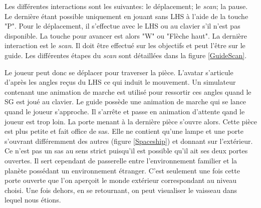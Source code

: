 		\begin{minipage}{\linewidth}
			\label{RoomAndHUD}
		\end{minipage}\medskip	
		
		Les différentes interactions sont les suivantes: le déplacement; le \textit{scan}; la pause. Le dernière étant possible uniquement en jouant sans LHS à l'aide de la touche "P". Pour le déplacement, il s'effectue avec le LHS ou au clavier s'il n'est pas disponible. La touche pour avancer est alors "W" ou "Flèche haut". La dernière interaction est le \textit{scan}. Il doit être effectué sur les objectifs et peut l'être sur le guide. Les différentes étapes du \textit{scan} sont détaillées dans la figure \ref{GuideScan}.
	
		Le joueur peut donc se déplacer pour traverser la pièce. L'avatar s'articule d'après les angles reçus du LHS ce qui induit le mouvement. Un simulateur contenant une animation de marche est utilisé pour ressortir ces angles quand le SG est joué au clavier. Le guide possède une animation de marche qui se lance quand le joueur s'approche. Il s'arrête et passe en animation d'attente qand le joueur est trop loin. La porte menant à la dernière pièce s'ouvre alors. Cette pièce est plus petite et fait office de sas. Elle ne contient qu'une lampe et une porte s'ouvrant différemment des autres (figure \ref{Spaceship}) et donnant sur l'extérieur. Ce n'est pas un sas au sens strict puisqu'il est possible qu'il ait ses deux portes ouvertes. Il sert cependant de passerelle entre l'environnement familier et la planète possédant un environnement étranger. C'est seulement une fois cette porte ouverte que l'on aperçoit le monde extérieur correspondant au niveau choisi. Une fois dehors, en se retournant, on peut visualiser le vaisseau dans lequel nous étions.
		\\
	
